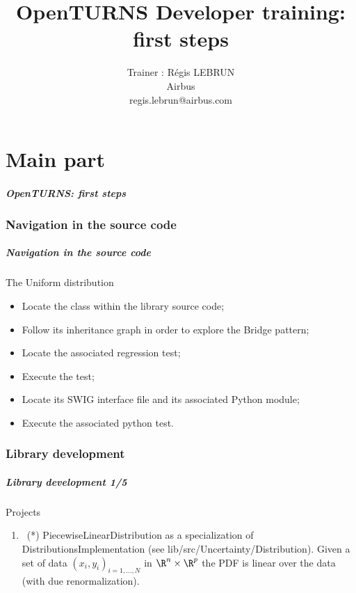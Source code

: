 \documentclass[8pt]{beamer}
\title[OpenTURNS Developer training]{OpenTURNS Developer training: first steps}
\author[OpenTURNS Consortium, 2024]
{
  Trainer : R\'egis LEBRUN\\
  Airbus \\
  regis.lebrun@airbus.com
}
\date[19-22 March 2024]
{
  Developers training \\

  \begin{center}
    \texttt{[image: logoOT.jpg]}
  \end{center}
}
\begin{document}
\frame{\titlepage}

\part{Main part}

\begin{frame}
  \frametitle{OpenTURNS: first steps}
  \tableofcontents[part=1]
\end{frame}

\section{Navigation in the source code}

\begin{frame}
  \frametitle{Navigation in the source code}
  \begin{block}{The Uniform distribution}
    \begin{itemize}
    \item Locate the class within the library source code;
    \item Follow its inheritance graph in order to explore the Bridge pattern;
    \item Locate the associated regression test;
    \item Execute the test;
    \item Locate its SWIG interface file and its associated Python module;
    \item Execute the associated python test.
    \end{itemize}
  \end{block}
\end{frame}


\section{Library development}

\begin{frame}
  \frametitle{Library development 1/5}
  \begin{block}{Projects}
    \begin{enumerate}
      \item~(*) \alert{\ttfamily PiecewiseLinearDistribution} as a specialization of \alert{\ttfamily DistributionsImplementation} (see {\ttfamily lib/src/Uncertainty/Distribution}). Given a set of data $(x_i, y_i)_{i=1,\dots,N}$ in $\R^n\times\R^p$
      the PDF is linear over the data (with due renormalization).
    \end{enumerate}
  \end{block}
\end{frame}
\end{document}
